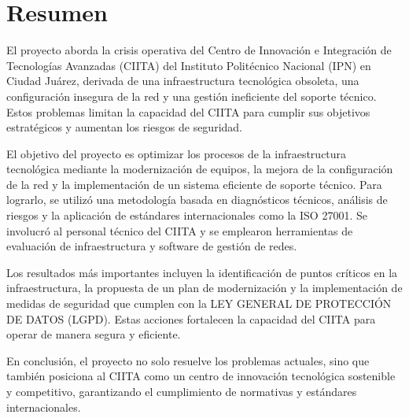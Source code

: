 \section*{Resumen}
El proyecto aborda la crisis operativa del Centro de Innovación e Integración de Tecnologías Avanzadas (CIITA) del Instituto Politécnico Nacional (IPN) en Ciudad Juárez, derivada de una infraestructura tecnológica obsoleta, una configuración insegura de la red y una gestión ineficiente del soporte técnico. Estos problemas limitan la capacidad del CIITA para cumplir sus objetivos estratégicos y aumentan los riesgos de seguridad.

El objetivo del proyecto es optimizar los procesos de la infraestructura tecnológica mediante la modernización de equipos, la mejora de la configuración de la red y la implementación de un sistema eficiente de soporte técnico. Para lograrlo, se utilizó una metodología basada en diagnósticos técnicos, análisis de riesgos y la aplicación de estándares internacionales como la ISO 27001. Se involucró al personal técnico del CIITA y se emplearon herramientas de evaluación de infraestructura y software de gestión de redes.

Los resultados más importantes incluyen la identificación de puntos críticos en la infraestructura, la propuesta de un plan de modernización y la implementación de medidas de seguridad que cumplen con la LEY GENERAL DE PROTECCIÓN DE DATOS (LGPD). Estas acciones fortalecen la capacidad del CIITA para operar de manera segura y eficiente.

En conclusión, el proyecto no solo resuelve los problemas actuales, sino que también posiciona al CIITA como un centro de innovación tecnológica sostenible y competitivo, garantizando el cumplimiento de normativas y estándares internacionales.

